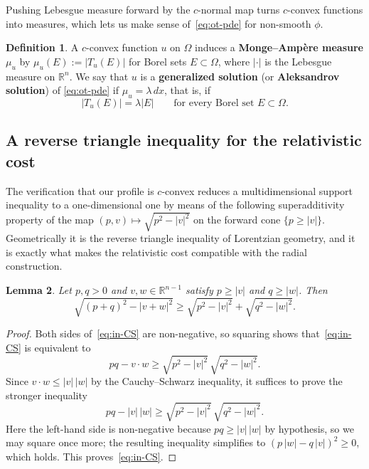 \documentclass[12pt,letterpaper]{amsart}
\theoremstyle{definition}
\newtheorem{definition}{Definition}[section]
\theoremstyle{plain}
\newtheorem{lemma}[definition]{Lemma}
\numberwithin{equation}{section}
\newcommand{\R}{\mathbb{R}}
\newcommand{\Om}{\Omega}
\begin{document}
Pushing Lebesgue measure forward by the $c$-normal map turns $c$-convex functions into measures,
which lets us make sense of~\eqref{eq:ot-pde} for non-smooth $\phi$.

\begin{definition}\label{def:gs}
    A $c$-convex function $u$ on $\Om$ induces a {\bf Monge--Amp\`ere measure} $\mu_u$ by
    $\mu_u(E):=|T_u(E)|$ for Borel sets $E\subset\Om$, where $|\cdot|$ is the Lebesgue measure
    on $\R^n$. We say that $u$ is a {\bf generalized solution} (or {\bf Aleksandrov solution}) of
    \eqref{eq:ot-pde} if $\mu_u=\lambda\,dx$, that is, if
    \begin{equation}\label{eq:T_u-id}
        |T_u(E)|=\lambda|E|\qquad\text{for every Borel set }E\subset\Om.
    \end{equation}
\end{definition}

\subsection{A reverse triangle inequality for the relativistic cost}

The verification that our profile is $c$-convex reduces a multidimensional support inequality to
a one-dimensional one by means of the following superadditivity property of the map
$(p,v)\mapsto\sqrt{p^2-|v|^2}$ on the forward cone $\{p\geq|v|\}$. Geometrically it is the
reverse triangle inequality of Lorentzian geometry, and it is exactly what makes the
relativistic cost compatible with the radial construction.

\begin{lemma}\label{lem:in-CS}
    Let $p,q>0$ and $v,w\in\R^{n-1}$ satisfy $p\geq|v|$ and $q\geq|w|$. Then
    \begin{equation}\label{eq:in-CS}
        \sqrt{(p+q)^2-|v+w|^2}\geq\sqrt{p^2-|v|^2}+\sqrt{q^2-|w|^2}.
    \end{equation}
\end{lemma}
\begin{proof}
    Both sides of~\eqref{eq:in-CS} are non-negative, so squaring shows that~\eqref{eq:in-CS} is
    equivalent to
    \[
        pq-v\cdot w\geq\sqrt{p^2-|v|^2}\,\sqrt{q^2-|w|^2}.
    \]
    Since $v\cdot w\leq|v|\,|w|$ by the Cauchy--Schwarz inequality, it suffices to prove the
    stronger inequality
    \[
        pq-|v|\,|w|\geq\sqrt{p^2-|v|^2}\,\sqrt{q^2-|w|^2}.
    \]
    Here the left-hand side is non-negative because $pq\geq|v|\,|w|$ by hypothesis, so we may
    square once more; the resulting inequality simplifies to $(p\,|w|-q\,|v|)^2\geq0$, which
    holds. This proves~\eqref{eq:in-CS}.
\end{proof}
\end{document}
